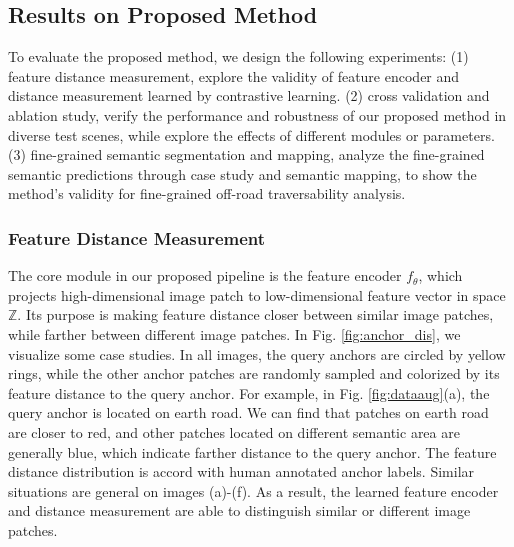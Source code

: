 \documentclass[letterpaper, 10 pt, conference]{ieeeconf}  %
\begin{document}
\subsection{Results on Proposed Method}
To evaluate the proposed method, we design the following experiments: (1) feature distance measurement, explore the validity of feature encoder and distance measurement learned by contrastive learning. (2) cross validation and ablation study, verify the performance and robustness of our proposed method in diverse test scenes, while explore the effects of different modules or parameters. (3) fine-grained semantic segmentation and mapping, analyze the fine-grained semantic predictions through case study and semantic mapping, to show the method's validity for fine-grained off-road traversability analysis.


\subsubsection{Feature Distance Measurement}
The core module in our proposed pipeline is the feature encoder $f_\theta$, which projects high-dimensional image patch to low-dimensional feature vector in space $\mathbb{Z}$. Its purpose is making feature distance closer between similar image patches, while farther between different image patches. In Fig. \ref{fig:anchor_dis}, we visualize some case studies. In all images, the query anchors are circled by yellow rings, while the other anchor patches are randomly sampled and colorized by its feature distance to the query anchor. For example, in Fig. \ref{fig:dataaug}(a), the query anchor is located on earth road. We can find that patches on earth road are closer to red, and other patches located on different semantic area are generally blue, which indicate farther distance to the query anchor. The feature distance distribution is accord with human annotated anchor labels. Similar situations are general on images (a)-(f). As a result, the learned feature encoder and distance measurement are able to distinguish similar or different image patches.
\end{document}
